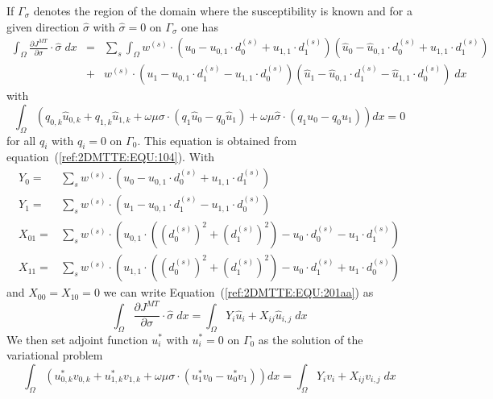 If $\Gamma_{\sigma}$ denotes the region of the domain where the susceptibility is
known and for a given direction $\hat{\sigma}$ with $\hat{\sigma}=0$ on $\Gamma_{\sigma}$ one has
\begin{align}\label{ref:2DMTTE:EQU:201aa}
\int_{\Omega}   \frac{\partial J^{MT}}{\partial \sigma} \cdot \hat{\sigma} \; dx  & = &
\sum_{s} \int_{\Omega}  w^{(s)} \cdot \left(  u_0 - u_{0,1} \cdot d_0^{(s)} + u_{1,1} \cdot d_1^{(s)}  \right ) \left(  \hat{u}_0 - \hat{u}_{0,1} \cdot d_0^{(s)} + \hat{u}_{1,1}\cdot d_1^{(s)}  \right )  \\
& + &  w^{(s)} \cdot \left(u_1- u_{0,1} \cdot d_1^{(s)} -u_{1,1} \cdot d_0^{(s)}  \right)   \left(\hat{u}_1- \hat{u}_{0,1} \cdot d_1^{(s)} -\hat{u}_{1,1} \cdot d_0^{(s)} \right) \; dx 
\end{align} 
with
\begin{equation}\label{ref:2DMTTE:EQU:201A}
\int_{\Omega}
\left(
q_{0,k}\hat{u}_{0,k}
+ q_{1,k}\hat{u}_{1,k}
+ \omega \mu \sigma \cdot ( q_1 \hat{u}_0 - q_0 \hat{u}_1)   
+ \omega \mu \hat{\sigma} \cdot ( q_1 u_0 - q_0 u_1) \right) dx =0
\end{equation}
for all $q_i$ with $q_i=0$ on $\Gamma_{0}$. This equation is obtained from equation~(\ref{ref:2DMTTE:EQU:104}).
With
\begin{align}\label{ref:2DMTTE:EQU:202c}
Y_0  = & \sum_{s} w^{(s)} \cdot \left(  u_0 - u_{0,1} \cdot d_0^{(s)} + u_{1,1} \cdot d_1^{(s)}  \right) \\
Y_1  = & \sum_{s} w^{(s)} \cdot \left(  u_1 - u_{0,1} \cdot d_1^{(s)} - u_{1,1} \cdot d_0^{(s)}  \right)   \\
X_{01}  = &  \sum_{s} w^{(s)} \cdot \left(    u_{0,1} \cdot ( ( d_0^{(s)})^2 + (d_1^{(s)})^2) -  u_0 \cdot d_0^{(s)} -  u_1 \cdot d_1^{(s)} \right)    \\
X_{11}  = & \sum_{s} w^{(s)} \cdot \left(  u_{1,1} \cdot ( ( d_0^{(s)})^2 + (d_1^{(s)})^2)  - u_0 \cdot d_1^{(s)} + u_1 \cdot d_0^{(s)} \right)
\end{align} 
and $X_{00}=X_{10}=0$ we can write Equation~(\ref{ref:2DMTTE:EQU:201aa}) as 
\begin{equation}\label{ref:2DMTTE:EQU:202c}
\int_{\Omega}   \frac{\partial J^{MT}}{\partial \sigma} \cdot \hat{\sigma} \; dx  =
\int_{\Omega}  Y_i \hat{u}_i + X_{ij}  \hat{u}_{i,j} \; dx
\end{equation}
We then set adjoint function $u_i^*$ with $u_i^*=0$ on $\Gamma_{0}$ as the solution of the variational problem  
\begin{equation}\label{ref:2DMTTE:EQU:202d}
\int_{\Omega}
\left(
u^*_{0,k} v_{0,k}
+ u^*_{1,k} v_{1,k}
+ \omega \mu \sigma \cdot ( u^*_1 v_0 - u^*_0 v_1) \right) dx = \int_{\Omega}  Y_i v_i + X_{ij}  v_{i,j} \; dx  
\end{equation}
